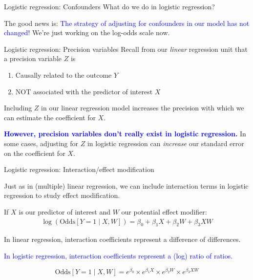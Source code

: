 \documentclass[10pt,t]{beamer}
\begin{document}
\begin{frame}{Logistic regression: Confounders}
	What do we do in logistic regression?
	\bigskip
	
	The good news is: \textcolor{blue}{The strategy of adjusting for confounders in our model has not changed!} We're just working on the log-odds scale now. 
	

\end{frame}


\begin{frame}{Logistic regression: Precision variables}
	Recall from our \textit{linear} regression unit that a precision variable $Z$ is 
	
	\medskip
	
	\begin{enumerate}
		\item Causally related to the outcome $Y$
		
	\medskip
		
		\item NOT associated with the predictor of interest $X$ 
	\end{enumerate}

\medskip

	Including $Z$ in our linear regression model increases the precision with which we can estimate the coefficient for $X$. 
	
	\bigskip
	
	\textbf{\textcolor{blue}{However, precision variables don't really exist in logistic regression.}} In some cases, adjusting for $Z$ in logistic regression can \textit{increase} our standard error on the coefficient for $X$. 

\end{frame}

\begin{frame}{Logistic regression: Interaction/effect modification}
	\vspace{-5 mm}
	
	Just as in (multiple) linear regression, we can include interaction terms in logistic regression to study effect modification. 
	
	\bigskip
	
	 If $X$ is our predictor of interest and $W$ our potential effect modifier: 
	\begin{align*}
	\log(\text{Odds}[Y = 1 \mid X, W]) = \beta_0 + \beta_1X + \beta_2W + \beta_3XW
	\end{align*} 
	
	\medskip
	
	In linear regression, interaction coefficients represent a difference of differences.
	
	\bigskip
	
	\textcolor{blue}{In logistic regression, interaction coefficients represent a (log) ratio of ratios.}
	
	
	\[\text{Odds}[Y = 1 \mid X, W] = e^{\beta_0}\times e^{\beta_1X}\times e^{\beta_2W} \times e^{\beta_3XW}\] 

\end{frame}
\end{document}
